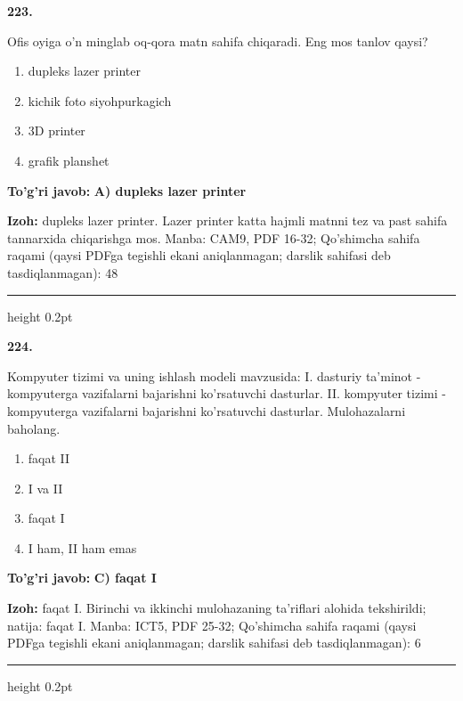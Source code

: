 \documentclass[10pt,a4paper]{article}
\begin{document}
{\bfseries\sffamily\color{ink} 223.}
\par
Ofis oyiga o'n minglab oq-qora matn sahifa chiqaradi. Eng mos tanlov qaysi?
\begin{enumerate}[label=\Alph*),leftmargin=9mm]
\item dupleks lazer printer
\item kichik foto siyohpurkagich
\item 3D printer
\item grafik planshet
\end{enumerate}
\begin{tcolorbox}[enhanced,breakable,colback=teal!4,colframe=teal!60!black,boxrule=0.45pt,arc=1.2mm,left=2.7mm,right=2.7mm,top=1.8mm,bottom=1.8mm,before skip=2mm,after skip=2mm]
{\bfseries\sffamily\color{teal}To'g'ri javob:} \textbf{A) dupleks lazer printer}
\par\smallskip
{\bfseries Izoh:} dupleks lazer printer. Lazer printer katta hajmli matnni tez va past sahifa tannarxida chiqarishga mos. Manba: CAM9, PDF 16-32; Qo'shimcha sahifa raqami (qaysi PDFga tegishli ekani aniqlanmagan; darslik sahifasi deb tasdiqlanmagan): 48
\end{tcolorbox}
\vspace{2mm}\hrule height 0.2pt\vspace{3mm}

{\bfseries\sffamily\color{ink} 224.}
\par
Kompyuter tizimi va uning ishlash modeli mavzusida: I. dasturiy ta'minot - kompyuterga vazifalarni bajarishni ko'rsatuvchi dasturlar. II. kompyuter tizimi - kompyuterga vazifalarni bajarishni ko'rsatuvchi dasturlar. Mulohazalarni baholang.
\begin{enumerate}[label=\Alph*),leftmargin=9mm]
\item faqat II
\item I va II
\item faqat I
\item I ham, II ham emas
\end{enumerate}
\begin{tcolorbox}[enhanced,breakable,colback=teal!4,colframe=teal!60!black,boxrule=0.45pt,arc=1.2mm,left=2.7mm,right=2.7mm,top=1.8mm,bottom=1.8mm,before skip=2mm,after skip=2mm]
{\bfseries\sffamily\color{teal}To'g'ri javob:} \textbf{C) faqat I}
\par\smallskip
{\bfseries Izoh:} faqat I. Birinchi va ikkinchi mulohazaning ta'riflari alohida tekshirildi; natija: faqat I. Manba: ICT5, PDF 25-32; Qo'shimcha sahifa raqami (qaysi PDFga tegishli ekani aniqlanmagan; darslik sahifasi deb tasdiqlanmagan): 6
\end{tcolorbox}
\vspace{2mm}\hrule height 0.2pt\vspace{3mm}
\end{document}
